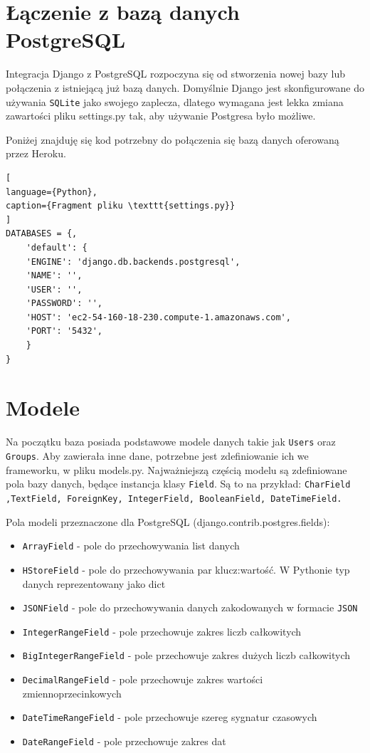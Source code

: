 \documentclass[oneside,polski,logo,indent]{amuthesis}
\begin{document}
\section{Łączenie z bazą danych PostgreSQL}
Integracja Django z PostgreSQL rozpoczyna się od stworzenia nowej bazy lub połączenia z istniejącą już bazą danych.
Domyślnie Django jest skonfigurowane do używania \texttt{SQLite} jako swojego zaplecza, dlatego wymagana jest lekka zmiana zawartości pliku settings.py tak, aby używanie Postgresa było możliwe. 

Poniżej znajduję się kod potrzebny do połączenia się bazą danych oferowaną przez Heroku. 
\begin{lstlisting}[
language={Python},
caption={Fragment pliku \texttt{settings.py}}
]
DATABASES = {,  
	'default': { 
	'ENGINE': 'django.db.backends.postgresql', 
	'NAME': '', 
	'USER': '', 
	'PASSWORD': '', 
	'HOST': 'ec2-54-160-18-230.compute-1.amazonaws.com', 
	'PORT': '5432', 
	} 
} 
\end{lstlisting}
\section{Modele}

Na początku baza posiada podstawowe modele danych takie jak  \texttt{Users} oraz \texttt{Groups}. Aby zawierała inne dane, potrzebne jest zdefiniowanie ich we frameworku, w pliku models.py.
Najważniejszą częścią modelu są zdefiniowane pola bazy danych, będące instancja klasy \texttt{Field}. Są to na przykład:  \texttt{CharField ,TextField, ForeignKey, IntegerField, BooleanField, DateTimeField.}

Pola modeli przeznaczone dla PostgreSQL (django.contrib.postgres.fields):

\begin{itemize}
	\item \texttt{ArrayField} - pole do przechowywania list danych
	\item \texttt{HStoreField} - pole do przechowywania par klucz:wartość. W Pythonie typ danych reprezentowany jako dict
	\item \texttt{JSONField} - pole do przechowywania danych zakodowanych w formacie \texttt{JSON}
	\item \texttt{IntegerRangeField} - pole przechowuje zakres liczb całkowitych
	\item \texttt{BigIntegerRangeField} - pole przechowuje zakres dużych liczb całkowitych
	\item \texttt{DecimalRangeField} - pole przechowuje zakres wartości zmiennoprzecinkowych
	\item \texttt{DateTimeRangeField} - pole przechowuje szereg sygnatur czasowych
	\item \texttt{DateRangeField} - pole przechowuje zakres dat
\end{itemize}
\end{document}
